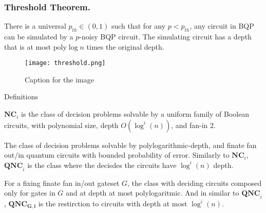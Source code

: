 \documentclass{beamer}
\newcommand*{\QNC}{ \mathbf{QNC} }
\newcommand*{\QNCG}{ \mathbf{QNC_G} }
\newcommand*{\NC}{\mathbf{NC}}
\newcommand*{\QNCiG}{\mathbf{QNC_{G,i}}}
\begin{document}
\begin{frame}
  \frametitle{Threshold Theorem.} 
  \begin{theorem}
There is a universal $p_{th} \in (0,1)$ such that for any $p < p_{th}$, any circuit in BQP can be simulated by a $p$-noisy BQP circuit. The simulating circuit has a depth that is at most $\text{poly} \log n$ times the original depth.
  \end{theorem}

\begin{figure}[h]
    \centering
    \texttt{[image: threshold.png]}
    \caption{Caption for the image}
    \label{fig:your-label}
\end{figure}
\end{frame}

\begin{frame}{Definitions}
\begin{definition}[$\NC$ - Nick's Class]
$\NC_i$ is the class of decision problems solvable by a uniform family of Boolean circuits, with polynomial size, depth $O(\log^i(n))$, and fan-in $2$. 
\end{definition}

\begin{definition}[$\QNC$]
  The class of decision problems solvable by polylogarithmic-depth, and finate fan out/in quantum circuits with bounded probability of error. Similarly to $\NC_i$, $\QNC_i$ is the class where the decisdes the circuits have $\log^i (n)$ depth.  
\end{definition}

\begin{definition}[$\QNCG$]
  For a fixing finate fan in/out gateset $G$, the class with deciding circuits composed only for gates in $G$ and at depth at most polylogaritmic. And in similar to $\QNC_{i}$, $\QNCiG$ is the restirction to circuits with depth at most $\log^{i}(n)$.  
\end{definition}
\end{frame}
\end{document}
